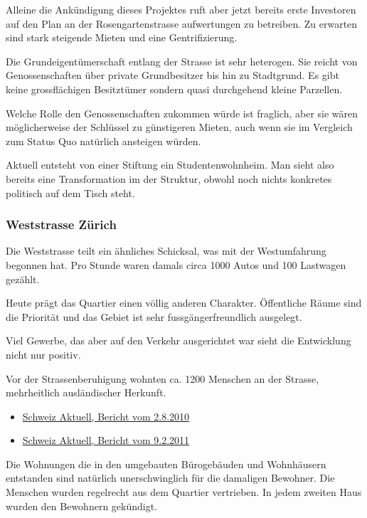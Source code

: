 \documentclass[a4paper,11pt,ngerman]{scrartcl}
\begin{document}
Alleine die Ankündigung dieses Projektes ruft aber jetzt bereits erste
Investoren auf den Plan an der Rosengartenstrasse aufwertungen zu
betreiben. Zu erwarten sind stark steigende Mieten und eine
Gentrifizierung.

Die Grundeigentümerschaft entlang der Strasse ist sehr heterogen. Sie reicht
von Genossenschaften über private Grundbesitzer bis hin zu Stadtgrund. Es
gibt keine grossflächigen Besitztümer sondern quasi durchgehend kleine
Parzellen.

Welche Rolle den Genossenschaften zukommen würde ist fraglich, aber sie wären
möglicherweise der Schlüssel zu günstigeren Mieten, auch wenn sie im
Vergleich zum Status Quo natürlich ansteigen würden.

Aktuell entsteht von einer Stiftung ein Studentenwohnheim. Man sieht also
bereits eine Transformation im der Struktur, obwohl noch nichts konkretes
politisch auf dem Tisch steht.

\subsubsection{Weststrasse Zürich}
\label{sec-2-1-2}

Die Weststrasse teilt ein ähnliches Schicksal, was mit der Westumfahrung
begonnen hat. Pro Stunde waren damals circa 1000 Autos und 100 Lastwagen
gezählt.

Heute prägt das Quartier einen völlig anderen Charakter. Öffentliche Räume
sind die Priorität und das Gebiet ist sehr fussgängerfreundlich ausgelegt.

Viel Gewerbe, das aber auf den Verkehr ausgerichtet war sieht die
Entwicklung nicht nur positiv.

Vor der Strassenberuhigung wohnten ca. 1200 Menschen an der Strasse,
mehrheitlich ausländischer Herkunft.

\begin{itemize}
\item \href{https://www.srf.ch/play/tv/tagesschau/video/weststrasse-endlich-wieder-ohne-verkehr?id\%3D77866ac6-343f-4af1-b856-b4dbf1a56092}{Schweiz Aktuell, Bericht vom 2.8.2010}
\item \href{https://www.srf.ch/play/tv/schweiz-aktuell/video/weststrasse?id\%3D7a960266-9558-460f-882f-db7c572aa28e}{Schweiz Aktuell, Bericht vom 9.2.2011}
\end{itemize}

Die Wohnungen die in den umgebauten Bürogebäuden und Wohnhäusern entstanden
sind natürlich unerschwinglich für die damaligen Bewohner. Die Menschen
wurden regelrecht aus dem Quartier vertrieben. In jedem zweiten Haus wurden
den Bewohnern gekündigt.
\end{document}
